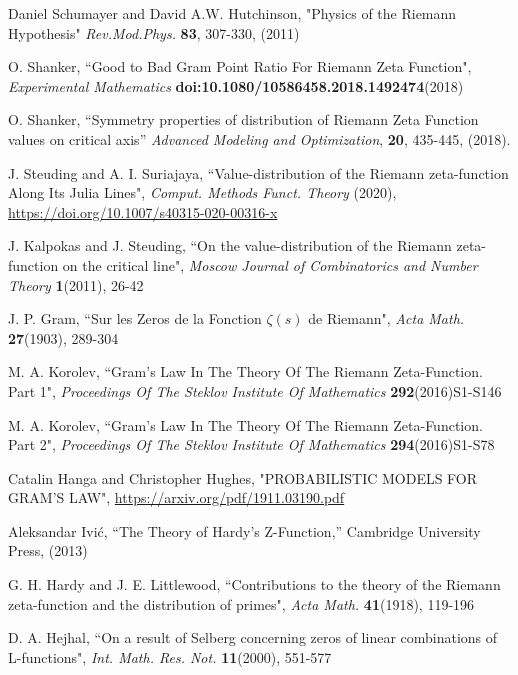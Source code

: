 \documentclass[twoside]{article}
\begin{document}
\begin{thebibliography}{10}
 Daniel Schumayer and David A.W. Hutchinson,
"Physics of the Riemann Hypothesis"
{\it Rev.Mod.Phys.} {\bf83}, 307-330, (2011)

 O. Shanker, 
``Good to Bad Gram Point Ratio For Riemann Zeta Function",
{\it Experimental Mathematics} {\bf doi:10.1080/10586458.2018.1492474}(2018)

 O. Shanker, 
``Symmetry properties of distribution of Riemann Zeta Function values on critical axis''
{\it Advanced Modeling and Optimization}, {\bf 20}, 435-445, (2018). 

 J. Steuding and A. I. Suriajaya,
``Value-distribution of the Riemann zeta-function Along Its Julia Lines", 
{\it  Comput. Methods Funct. Theory} (2020), 
\url{https://doi.org/10.1007/s40315-020-00316-x}

 J. Kalpokas and J. Steuding,
``On the value-distribution of the Riemann zeta-function on the critical line", 
{\it Moscow Journal of Combinatorics and
Number Theory} {\bf1}(2011), 26-42

 J. P. Gram, 
``Sur les Zeros de la Fonction  $\zeta ( s )$  de Riemann",
{\it Acta Math.} {\bf27}(1903), 289-304

 M. A. Korolev, 
``Gram’s Law In The Theory Of The Riemann Zeta-Function. Part 1",
{\it Proceedings Of The Steklov Institute Of Mathematics} {\bf292}(2016)S1-S146 

 M. A. Korolev, 
``Gram’s Law In The Theory Of The Riemann Zeta-Function. Part 2",
{\it Proceedings Of The Steklov Institute Of Mathematics} {\bf294}(2016)S1-S78 




 Catalin Hanga and Christopher Hughes,
"PROBABILISTIC MODELS FOR GRAM’S LAW", \url {https://arxiv.org/pdf/1911.03190.pdf}


 Aleksandar Ivi\'c, ``The Theory of Hardy's Z-Function,''
Cambridge University Press,  (2013)

 G. H. Hardy and J. E. Littlewood,
``Contributions to the theory of the Riemann
zeta-function and the distribution of primes",
{\it Acta Math.} {\bf41}(1918), 119-196

 D. A. Hejhal,
``On a result of Selberg concerning zeros of linear combinations
of L-functions", 
{\it Int. Math. Res. Not.} {\bf11}(2000), 551-577


\end{thebibliography}
\end{document}
